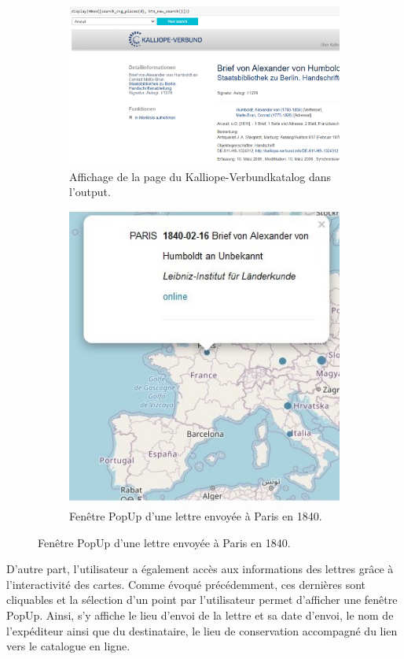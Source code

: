 \documentclass[a4paper, 12pt, twoside]{book}
\begin{document}
\begin{changemargin}{-1.5cm}{-1cm}
\begin{figure}
    \centering
    \caption{Accès aux catalogues en ligne. }
    \begin{subfigure}[b]{0.6\textwidth}
        \centering
        \includegraphics[height=0.5\linewidth]{img/recherche_website.png}
        \caption{Affichage de la page du Kalliope-Verbundkatalog dans l'output.}
    \end{subfigure}
    \begin{subfigure}[b]{0.34\textwidth}
        \centering
        \includegraphics[height=0.9\linewidth]{img/mapviz_1840_radius_popup.jpg}
        \caption{Fenêtre PopUp d'une lettre envoyée à Paris en 1840.}
    \end{subfigure}
    \vspace{-10pt}
\end{figure}
\end{changemargin}
\vspace{-20pt}
D'autre part, l'utilisateur a également accès aux informations des lettres grâce à l'interactivité des cartes. Comme évoqué précédemment, ces dernières sont cliquables et la sélection d'un point par l'utilisateur permet d'afficher une fenêtre PopUp. Ainsi, s'y affiche le lieu d'envoi de la lettre et sa date d'envoi, le nom de l'expéditeur ainsi que du destinataire, le lieu de conservation accompagné du lien vers le catalogue en ligne. 
\end{document}
